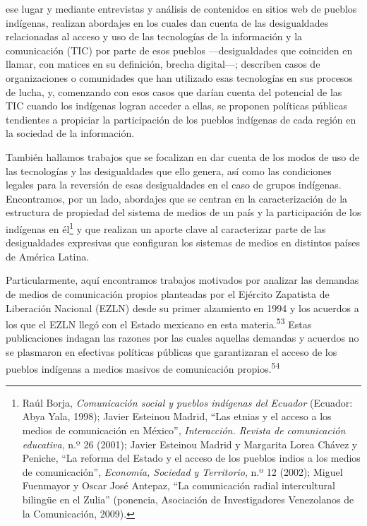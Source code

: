 \documentclass{tufte-handout}
\begin{document}
ese lugar y mediante entrevistas y análisis de contenidos en sitios web
de pueblos indígenas, realizan abordajes en los cuales dan cuenta de las
desigualdades relacionadas al acceso y uso de las tecnologías de la
información y la comunicación (TIC) por parte de esos pueblos
---desigualdades que coinciden en llamar, con matices en su definición,
brecha digital---; describen casos de organizaciones o comunidades que
han utilizado esas tecnologías en sus procesos de lucha, y, comenzando
con esos casos que darían cuenta del potencial de las TIC cuando los
indígenas logran acceder a ellas, se proponen políticas públicas
tendientes a propiciar la participación de los pueblos indígenas de cada
región en la sociedad de la información.

También hallamos trabajos que se focalizan en dar cuenta de los modos de
uso de las tecnologías y las desigualdades que ello genera, así como las
condiciones legales para la reversión de esas desigualdades en el caso
de grupos indígenas. Encontramos, por un lado, abordajes que se centran
en la caracterización de la estructura de propiedad del sistema de
medios de un país y la participación de los indígenas en él\footnote{Raúl
  Borja, \emph{Comunicación social y pueblos indígenas del Ecuador}
  (Ecuador: Abya Yala, 1998); Javier Esteinou Madrid, ``Las etnias y el
  acceso a los medios de comunicación en México'', \emph{Interacción.
  Revista de comunicación educativa}, n.º 26 (2001);
  Javier Esteinou Madrid y Margarita Lorea Chávez y Peniche, ``La
  reforma del Estado y el acceso de los pueblos indios a los medios de
  comunicación'', \emph{Economía, Sociedad y Territorio}, n.º 12 (2002); Miguel
  Fuenmayor y Oscar José Antepaz, ``La comunicación radial intercultural
  bilingüe en el Zulia'' (ponencia, Asociación de Investigadores
  Venezolanos de la Comunicación, 2009).}
y que realizan un aporte clave al caracterizar parte de las
desigualdades expresivas que configuran los sistemas de medios en
distintos países de América Latina.

Particularmente, aquí encontramos trabajos motivados por analizar las
demandas de medios de comunicación propios planteadas por el Ejército
Zapatista de Liberación Nacional (EZLN) desde su primer alzamiento en
1994 y los acuerdos a los que el EZLN llegó con el Estado mexicano en
esta materia.\textsuperscript{53}
Estas publicaciones indagan las razones por las cuales aquellas demandas
y acuerdos no se plasmaron en efectivas políticas públicas que
garantizaran el acceso de los pueblos indígenas a medios masivos de
comunicación propios.\textsuperscript{54}
\end{document}

